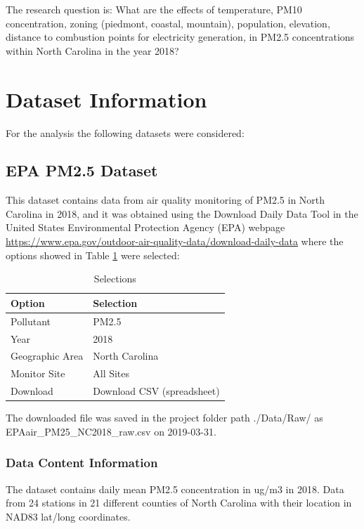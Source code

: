 \documentclass[12pt,]{article}
\begin{document}
The research question is: What are the effects of temperature, PM10
concentration, zoning (piedmont, coastal, mountain), population,
elevation, distance to combustion points for electricity generation, in
PM2.5 concentrations within North Carolina in the year 2018?

\newpage

\section{Dataset Information}\label{dataset-information}

For the analysis the following datasets were considered:

\subsection{EPA PM2.5 Dataset}\label{epa-pm2.5-dataset}

This dataset contains data from air quality monitoring of PM2.5 in North
Carolina in 2018, and it was obtained using the Download Daily Data Tool
in the United States Environmental Protection Agency (EPA) webpage
\url{https://www.epa.gov/outdoor-air-quality-data/download-daily-data}
where the options showed in Table \ref{tab:tab1} were selected:

\begin{table}[ht]
\centering
\begin{tabular}{ll}
  \hline
Option & Selection \\ 
  \hline
Pollutant & PM2.5 \\ 
  Year & 2018 \\ 
  Geographic Area & North Carolina \\ 
  Monitor Site & All Sites \\ 
  Download & Download CSV (spreadsheet) \\ 
   \hline
\end{tabular}
\caption{Selections} 
\label{tab:tab1}
\end{table}

The downloaded file was saved in the project folder path ./Data/Raw/ as
EPAair\_PM25\_NC2018\_raw.csv on 2019-03-31.

\subsubsection{Data Content Information}\label{data-content-information}

The dataset contains daily mean PM2.5 concentration in ug/m3 in 2018.
Data from 24 stations in 21 different counties of North Carolina with
their location in NAD83 lat/long coordinates.
\end{document}
